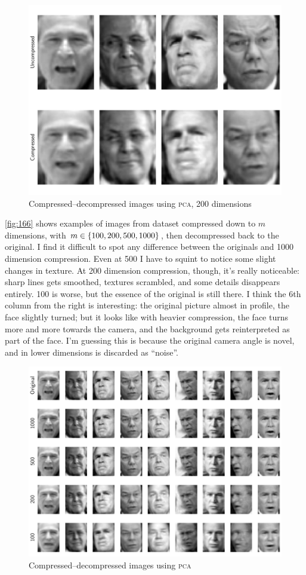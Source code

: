 \documentclass[british]{article}
\newcommand{\pca}{\texorpdfstring{\textsc{pca}}{PCA}}
\begin{document}
\begin{figure}
  \centering
  \includegraphics[width=0.9\columnwidth]{fig/165.pdf}
  \caption{Compressed--decompressed images using \pca, 200 dimensions}
  \label{fig:165}
\end{figure}


\autoref{fig:166} shows examples of images from dataset compressed down to $m$
dimensions, with $m \in \cbr{100, 200, 500, 1000}$, then decompressed back to
the original. I find it difficult to spot any difference between the originals
and 1000 dimension compression. Even at 500 I have to squint to notice some
slight changes in texture. At 200 dimension compression, though, it's really
noticeable: sharp lines gets smoothed, textures scrambled, and some details
disappears entirely. 100 is worse, but the essence of the original is still
there. I think the 6th column from the right is interesting: the original
picture almost in profile, the face slightly turned; but it looks like with
heavier compression, the face turns more and more towards the camera, and the
background gets reinterpreted as part of the face. I'm guessing this is because
the original camera angle is novel, and in lower dimensions is discarded as
“noise”.

\begin{figure}
  \centering
  \includegraphics[width=0.9\columnwidth]{fig/166.pdf}
  \caption{Compressed--decompressed images using \pca}
  \label{fig:166}
\end{figure}
\end{document}
